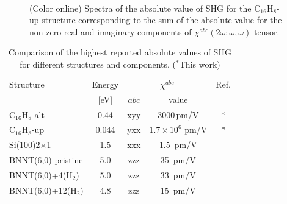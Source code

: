 \documentclass[pss]{wiley2sp} %
\begin{document}
\begin{figure}[t]
\\
\caption{(Color online) Spectra of the absolute value of SHG for the
C$_{16}$H$_{8}$-up structure corresponding to the sum of the absolute value
for the non zero real and imaginary components of
$\chi^{abc}(2\omega;\omega,\omega) $ tensor.\label{fig:shg-vnl-up}}
\end{figure}

\begin{table}[htb]%
\sidecaption
\begin{tabular}{lcccc}
\hline
\hline
Structure & \hspace{-5mm}Energy & \multicolumn{2}{c}{$\chi^{abc} $} &  Ref.\\
\cline{3-4} & \hspace{-5mm}[eV] & $abc$ & value \\
\hline
C$_{16}$H$_{8}$-alt   & \hspace{-5mm}0.44  & xyy   & 3000\,\scriptsize{pm/V}  & *     \\
C$_{16}$H$_{8}$-up    & \hspace{-5mm}0.044 & yxx   & $1.7\times10^{6}$ \scriptsize{pm/V}  & *     \\
Si(100)2$\times$1     & \hspace{-5mm}1.5   & xxx   & 1.5\, \scriptsize{pm/V}  & \cite{andersonPRB15}  \\
BNNT(6,0) pristine    & \hspace{-5mm}5.0   & zzz   & 35\,  \scriptsize{pm/V}  & \cite{salazarPRB14} \\
BNNT(6,0)+4(H$_{2}$)  & \hspace{-5mm}5.0   & zzz   & 33\,  \scriptsize{pm/V}  & \cite{salazarPRB14} \\
BNNT(6,0)+12(H$_{2}$) & \hspace{-5mm}4.8   & zzz   & 15\,  \scriptsize{pm/V}  & \cite{salazarPRB14} \\
\hline
\hline
\end{tabular}
\caption[]{%
Comparison of the highest reported absolute values of SHG for 
different structures and components. ($^{*}$This work)}
\label{tab:shgcomp}
\end{table}
\end{document}
